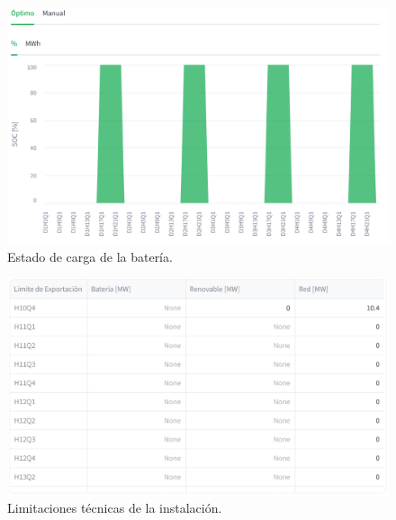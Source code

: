 \begin{figure}
  \centering
  \includegraphics[width=0.75\linewidth]{figures/soc-bess.png}
  \caption[Estado de carga de la batería.]{Estado de carga de la batería.}
  \label{fig:soc-bess}
\end{figure}

\begin{figure}
  \centering
  \includegraphics[width=0.75\linewidth]{figures/limitaciones-tecnicas.png}
  \caption[Limitaciones técnicas de la instalación.]{Limitaciones técnicas de la instalación.}
  \label{fig:limitaciones-tecnicas}
\end{figure}
